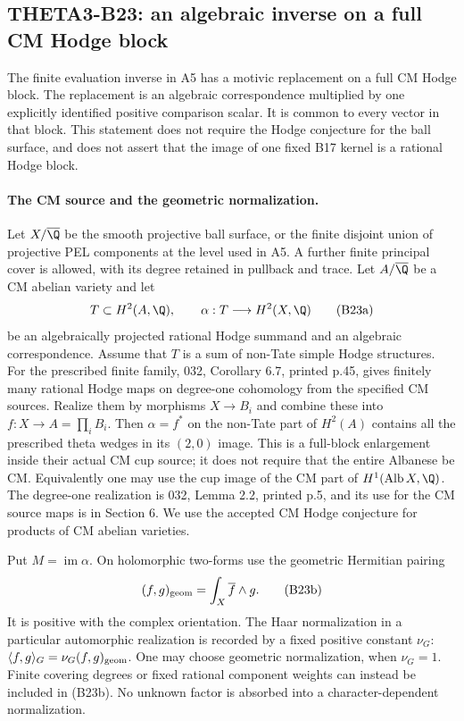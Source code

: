 \subsection{THETA3-B23: an algebraic inverse on a full CM Hodge block}\label{B23}

The finite evaluation inverse in A5 has a motivic replacement on
a full CM Hodge block.  The replacement is an algebraic
correspondence multiplied by one explicitly identified positive
comparison scalar.  It is common to every vector in that block.
This statement does not require the Hodge conjecture for the ball
surface, and does not assert that the image of one fixed B17
kernel is a rational Hodge block.

\paragraph{The CM source and the geometric normalization.}
Let $X/\overline\Q$ be the smooth projective ball surface, or the
finite disjoint union of projective PEL components at the level
used in A5.  A further finite principal cover is allowed, with
its degree retained in pullback and trace.  Let $A/\overline\Q$
be a CM abelian variety and let
\[
 T\subset H^2(A,\Q),\qquad
 \alpha:T\longrightarrow H^2(X,\Q)
 \tag{B23a}
\]
be an algebraically projected rational Hodge summand and an
algebraic correspondence.  Assume that $T$ is a sum of non-Tate
simple Hodge structures.  For the prescribed finite family,
032, Corollary 6.7, printed p.45, gives finitely many rational
Hodge maps on degree-one cohomology from the specified CM sources.
Realize them by morphisms
$X\to B_i$ and combine these into $f:X\to A=\prod_iB_i$.
Then $\alpha=f^*$ on the non-Tate part of $H^2(A)$ contains
all the prescribed theta wedges in its $(2,0)$ image.
This is a full-block enlargement inside their actual CM cup
source; it does not require that the entire Albanese be CM.
Equivalently one may use the cup image of the CM part of
$H^1(\operatorname{Alb}X,\Q)$.  The degree-one realization
is 032, Lemma 2.2, printed p.5, and its use for the CM source
maps is in Section 6.  We use the accepted CM
Hodge conjecture for products of CM abelian varieties.

Put $M=\operatorname{im}\alpha$.  On holomorphic two-forms use
the geometric Hermitian pairing
\[
                  (f,g)_{\rm geom}=\int_X\overline f\wedge g.
 \tag{B23b}
\]
It is positive with the complex orientation.  The Haar
normalization in a particular automorphic realization is
recorded by a fixed positive constant $\nu_G$:
$\langle f,g\rangle_G=\nu_G(f,g)_{\rm geom}$.
One may choose geometric normalization, when $\nu_G=1$.
Finite covering degrees or fixed rational component weights
can instead be included in (B23b).  No unknown factor is
absorbed into a character-dependent normalization.

